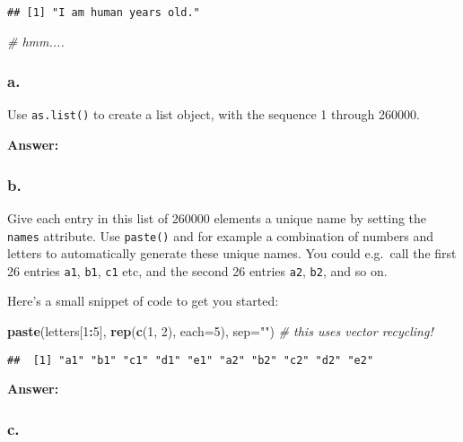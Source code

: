 \documentclass[]{article}
\newenvironment{Shaded}{\begin{snugshade}}{\end{snugshade}}
\newcommand{\CommentTok}[1]{\textcolor[rgb]{0.56,0.35,0.01}{\textit{#1}}}
\newcommand{\DataTypeTok}[1]{\textcolor[rgb]{0.13,0.29,0.53}{#1}}
\newcommand{\DecValTok}[1]{\textcolor[rgb]{0.00,0.00,0.81}{#1}}
\newcommand{\KeywordTok}[1]{\textcolor[rgb]{0.13,0.29,0.53}{\textbf{#1}}}
\newcommand{\NormalTok}[1]{#1}
\newcommand{\OperatorTok}[1]{\textcolor[rgb]{0.81,0.36,0.00}{\textbf{#1}}}
\newcommand{\StringTok}[1]{\textcolor[rgb]{0.31,0.60,0.02}{#1}}
\begin{document}
\begin{verbatim}
## [1] "I am human years old."
\end{verbatim}

\begin{Shaded}
\begin{Highlighting}[]
\CommentTok{# hmm....}
\end{Highlighting}
\end{Shaded}

\hypertarget{a.-2}{%
\subsubsection{a.}\label{a.-2}}

Use \texttt{as.list()} to create a list object, with the sequence 1
through 260000.

\textbf{Answer:}

\hypertarget{b.-2}{%
\subsubsection{b.}\label{b.-2}}

Give each entry in this list of 260000 elements a unique name by setting
the \texttt{names} attribute. Use \texttt{paste()} and for example a
combination of numbers and letters to automatically generate these
unique names. You could e.g.~call the first 26 entries \texttt{a1},
\texttt{b1}, \texttt{c1} etc, and the second 26 entries \texttt{a2},
\texttt{b2}, and so on.

Here's a small snippet of code to get you started:

\begin{Shaded}
\begin{Highlighting}[]
\KeywordTok{paste}\NormalTok{(letters[}\DecValTok{1}\OperatorTok{:}\DecValTok{5}\NormalTok{], }\KeywordTok{rep}\NormalTok{(}\KeywordTok{c}\NormalTok{(}\DecValTok{1}\NormalTok{, }\DecValTok{2}\NormalTok{), }\DataTypeTok{each=}\DecValTok{5}\NormalTok{), }\DataTypeTok{sep=}\StringTok{""}\NormalTok{) }\CommentTok{# this uses vector recycling!}
\end{Highlighting}
\end{Shaded}

\begin{verbatim}
##  [1] "a1" "b1" "c1" "d1" "e1" "a2" "b2" "c2" "d2" "e2"
\end{verbatim}

\textbf{Answer:}

\hypertarget{c.-2}{%
\subsubsection{c.}\label{c.-2}}
\end{document}
